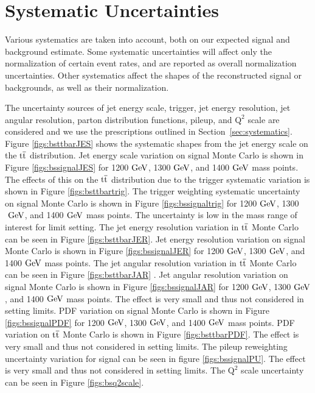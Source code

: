 \clearpage
\newpage
\chapter{Systematic Uncertainties}
\label{sec:bssystematics}
Various systematics are taken into account, both 
on our expected signal and background estimate. Some systematic uncertainties will affect only the normalization of certain event rates, 
and are reported as overall normalization uncertainties. Other systematics affect the shapes of the reconstructed signal or backgrounds, as well as their normalization.  

The uncertainty sources of jet energy scale, trigger, jet energy resolution, jet angular resolution,  parton distribution functions, pileup, and $\mathrm{Q^2}$ scale are considered 
and we use the prescriptions outlined in Section~\ref{sec:systematics}.  Figure \ref{figs:bsttbarJES} shows the systematic shapes from the 
jet energy scale on the $\mathrm{t\overline{t}}$ distribution.  Jet energy scale variation on signal Monte Carlo is shown in Figure \ref{figs:bssignalJES} for 1200$~\mathrm{GeV}$,
 1300$~\mathrm{GeV}$, and 1400$~\mathrm{GeV}$ mass points.  The effects of this on the $\mathrm{t\overline{t}}$ 
distribution due to the trigger systematic variation is shown in Figure \ref{figs:bsttbartrig}. The trigger weighting systematic uncertainty on signal Monte Carlo is 
shown in Figure \ref{figs:bssignaltrig} for 1200$~\mathrm{GeV}$,
 1300$~\mathrm{GeV}$, and 1400$~\mathrm{GeV}$ mass points.  The uncertainty is low in the mass range of interest for limit setting.  
The jet energy resolution variation in $\mathrm{t\overline{t}}$ Monte Carlo can be seen in Figure \ref{figs:bsttbarJER}.  Jet energy resolution variation on signal Monte Carlo 
is shown in Figure \ref{figs:bssignalJER} for 1200$~\mathrm{GeV}$, 1300$~\mathrm{GeV}$, and 1400$~\mathrm{GeV}$ mass points.  
The jet angular resolution variation in $\mathrm{t\overline{t}}$ Monte Carlo can be seen in Figure \ref{figs:bsttbarJAR} . Jet angular resolution 
variation on signal Monte Carlo is shown in Figure \ref{figs:bssignalJAR} for 1200$~\mathrm{GeV}$, 1300$~\mathrm{GeV}$, and 1400$~\mathrm{GeV}$ mass points.  
The effect is very small and thus not considered in setting limits.  PDF variation on signal Monte Carlo is shown in Figure \ref{figs:bssignalPDF} for 1200$~\mathrm{GeV}$,
 1300$~\mathrm{GeV}$, and 1400$~\mathrm{GeV}$ mass points.  PDF variation on $\mathrm{t\overline{t}}$ Monte Carlo is shown in Figure \ref{figs:bsttbarPDF}.  
The effect is very small and thus not considered in setting limits.  The pileup reweighting uncertainty variation for signal  
can be seen in figure \ref{figs:bssignalPU}.  The effect is very small and thus not considered in setting limits.  
The $\mathrm{Q^2}$ scale uncertainty can be seen in Figure \ref{figs:bsq2scale}.


